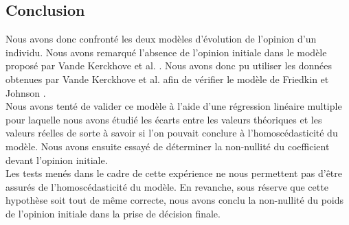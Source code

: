 \documentclass{scrreprt}
\begin{document}
\begin{multicols}{2}

\chapter{Conclusion}

Nous avons donc confronté les deux modèles d'évolution de l'opinion d'un individu. Nous avons remarqué l'absence de l'opinion initiale dans le modèle proposé par Vande Kerckhove et al. \cite{VMG}. Nous avons donc pu utiliser les données obtenues par Vande Kerckhove et al. \cite{VMG} afin de vérifier le modèle de Friedkin et Johnson \cite{FJ}.\\

Nous avons tenté de valider ce modèle à l'aide d'une régression linéaire multiple pour laquelle nous avons étudié les écarts entre les valeurs théoriques et les valeurs réelles de sorte à savoir si l'on pouvait conclure à l'homoscédasticité du modèle. Nous avons ensuite essayé de déterminer la non-nullité du coefficient devant l'opinion initiale.\\

Les tests menés dans le cadre de cette expérience ne nous permettent pas d'être assurés de l'homoscédasticité du modèle. En revanche, sous réserve que cette hypothèse soit tout de même correcte, nous avons conclu la non-nullité du poids de l'opinion initiale dans la prise de décision finale. \\


\end{multicols}



\end{document}
